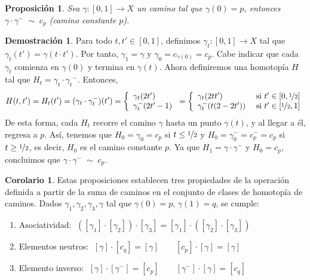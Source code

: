 \documentclass[12pt,twoside]{report}
\theoremstyle{azul}
\theoremstyle{azul2}
\theoremstyle{plain}
\newtheorem*{prop}{Proposición}
\theoremstyle{definition}
\newtheorem*{dem}{Demostración}
\newtheorem*{cor}{Corolario}
\theoremstyle{remark}
\begin{document}
\begin{prop}
Sea $\gamma: [0,1] \longrightarrow X$ un camino tal que $\gamma(0)=p$, entonces $\gamma \cdot \gamma^{-} \; \sim \; c_p$ (camino constante $p$).
\end{prop}
\begin{dem}
Para todo $t, t' \in [0,1]$, definimos $\gamma_t: [0,1] \longrightarrow X$ tal que $\gamma_t(t')=\gamma(t \cdot t')$. Por tanto, $\gamma_1=\gamma$ y $\gamma_0=c_{\gamma(0)}=c_p$. Cabe indicar que cada $\gamma_t$ comienza en $\gamma(0)$ y termina en $\gamma(t)$. Ahora definiremos una homotopía $H$ tal que $H_t=\gamma_t \cdot {\gamma_t}^{-}$. Entonces, 
$$H(t,t')=H_t(t')=(\gamma_t \cdot \gamma_t^{-})(t')=\left\{ \begin{array}{l}
     \gamma_t(2 t') \\
     \gamma_t^{-}(2 t' - 1) 
\end{array}\right.=\left\{ \begin{array}{l l}
     \gamma_t(2tt') & \text{ si } t' \in [0,\nicefrac{1}{2}] \\
     \gamma_t^{-}(t(2-2t')) & \text{ si } t' \in [\nicefrac{1}{2},1] 
\end{array}\right.$$
De esta forma, cada $H_t$ recorre el camino $\gamma$ hasta un punto $\gamma(t)$, y al llegar a {\'e}l, regresa a $p$. Así, tenemos que $H_0= \gamma_0 = c_p$ si $t \leq \nicefrac{1}{2}$ y $H_0 = \gamma_0^- = c_p^- = c_p$ si $t \geq \nicefrac{1}{2}$, es decir, $H_0$ es el camino constante $p$. Ya que $H_1=\gamma \cdot \gamma^{-}$ y $H_0 = c_p$, concluimos que $\gamma \cdot \gamma^- \;\sim\; c_p$.
\end{dem}

\begin{cor}
Estas proposiciones establecen tres propiedades de la operación definida a partir de la suma de caminos en el conjunto de clases de homotopía de caminos. Dados $\gamma_1, \gamma_2, \gamma_3, \gamma$ tal que $\gamma(0) = p,\, \gamma(1) = q$, se cumple:
\begin{enumerate}
    \item Asociatividad: $\;([\gamma_1] \cdot [\gamma_2]) \cdot [\gamma_3] = [\gamma_1] \cdot ([\gamma_2] \cdot [\gamma_3])$
    \item Elementos neutros: $\;[\gamma] \cdot [c_q] = [\gamma] \qquad [c_p] \cdot [\gamma] = [\gamma]$
    \item Elemento inverso: $\;[\gamma] \cdot [\gamma^-] = [c_p] \qquad [\gamma^-] \cdot [\gamma] = [c_q]$
\end{enumerate}
\end{cor}
\end{document}
